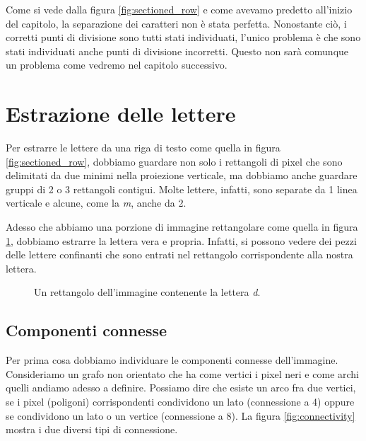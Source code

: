 Come si vede dalla figura \ref{fig:sectioned_row} e come avevamo predetto all'inizio del capitolo, la separazione dei caratteri non \`e stata perfetta. Nonostante ci\`o, i corretti punti di divisione sono tutti stati individuati, l'unico problema \`e che sono stati individuati anche punti di divisione incorretti. Questo non sar\`a comunque un problema come vedremo nel capitolo successivo.

\section{Estrazione delle lettere}

Per estrarre le lettere da una riga di testo come quella in figura \ref{fig:sectioned_row}, dobbiamo guardare non solo i rettangoli di pixel che sono delimitati da due minimi nella proiezione verticale, ma dobbiamo anche guardare gruppi di 2 o 3 rettangoli contigui. Molte lettere, infatti, sono separate da 1 linea verticale e alcune, come la \emph{m}, anche da 2.

Adesso che abbiamo una porzione di immagine rettangolare come quella in figura \ref{fig:unpolished_letter}, dobbiamo estrarre la lettera vera e propria. Infatti, si possono vedere dei pezzi delle lettere confinanti che sono entrati nel rettangolo corrispondente alla nostra lettera.

\begin{figure}
    \centering
    \caption{Un rettangolo dell'immagine contenente la lettera \emph{d}.}
    \label{fig:unpolished_letter}
\end{figure}

\subsection{Componenti connesse}

Per prima cosa dobbiamo individuare le componenti connesse dell'immagine. Consideriamo un grafo non orientato che ha come vertici i pixel neri e come archi quelli andiamo adesso a definire. Possiamo dire che esiste un arco fra due vertici, se i pixel (poligoni) corrispondenti condividono un lato (connessione a 4) oppure se condividono un lato o un vertice (connessione a 8). La figura \ref{fig:connectivity} mostra i due diversi tipi di connessione.

